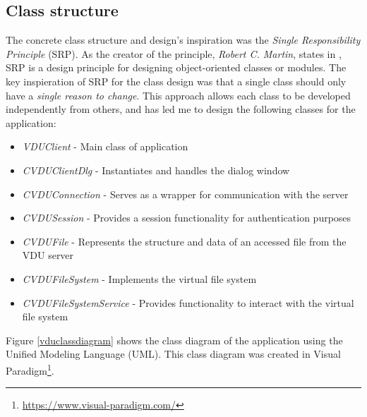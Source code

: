 \subsection{Class structure}
The concrete class structure and design's inspiration was the \textit{Single Responsibility Principle} (SRP). As the creator of the principle, \textit{Robert C. Martin}, states in \cite{CleanCodeBook}, SRP is a design principle for designing object-oriented classes or modules. The key inspieration of SRP for the class design was that a single class should only have a \textit{single reason to change}. This approach allows each class to be developed independently from others, and has led me to design the following classes for the application:
\begin{itemize}
    \item \textit{VDUClient} - Main class of application
    \item \textit{CVDUClientDlg} - Instantiates and handles the dialog window
    \item \textit{CVDUConnection} - Serves as a wrapper for communication with the server
    \item \textit{CVDUSession} - Provides a session functionality for authentication purposes
    \item \textit{CVDUFile} - Represents the structure and data of an accessed file from the VDU server
    \item \textit{CVDUFileSystem} - Implements the virtual file system
    \item \textit{CVDUFileSystemService} - Provides functionality to interact with the virtual file system
\end{itemize}
Figure \ref{vduclassdiagram} shows the class diagram of the application using the Unified Modeling Language (UML). This class diagram was created in Visual Paradigm\footnote{\url{https://www.visual-paradigm.com/}}.
